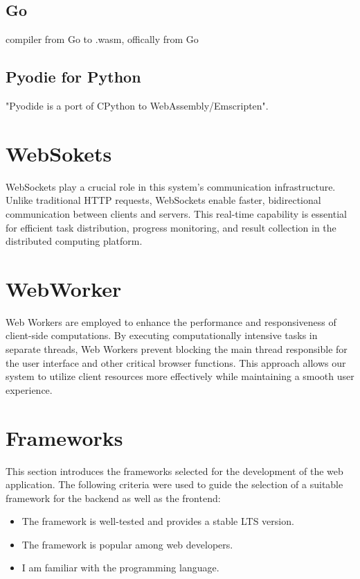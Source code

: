 \subsection{Go}
\label{subsec:methodology:wasm:go}
compiler from Go to .wasm, offically from Go \cite{methodology:go}
\subsection{Pyodie for Python}
\label{subsec:methodology:wasm:python}
"Pyodide is a port of CPython to WebAssembly/Emscripten". \cite{methodology:pyodie}

\section{WebSokets}
\label{sec:methodology:websokets}
WebSockets play a crucial role in this system's communication infrastructure. Unlike traditional HTTP requests, WebSockets enable faster, bidirectional communication between clients and servers. This real-time capability is essential for efficient task distribution, progress monitoring, and result collection in the distributed computing platform.

\cite{methodology:websockets1, methodology:websockets2, methodology:websockets3}

\section{WebWorker}
\label{sec:methodology:webworker}
Web Workers are employed to enhance the performance and responsiveness of client-side computations. By executing computationally intensive tasks in separate threads, Web Workers prevent blocking the main thread responsible for the user interface and other critical browser functions. This approach allows our system to utilize client resources more effectively while maintaining a smooth user experience.

\cite{methodology:webworkers}

\section{Frameworks}
\label{sec:methodology:frameworks}
This section introduces the frameworks selected for the development of the web application. The following criteria were used to guide the selection of a suitable framework for the backend as well as the frontend:
\begin{itemize}
    \item The framework is well-tested and provides a stable \ac{LTS} version.
    \item The framework is popular among web developers.
    \item I am familiar with the programming language.
\end{itemize}

